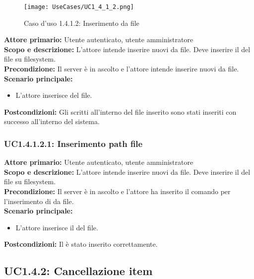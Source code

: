 \documentclass{scalatekids-article}
\begin{document}
\begin{figure}[H]
  \begin{center}
    \texttt{[image: UseCases/UC1\_4\_1\_2.png]}
    \caption*{Caso d'uso 1.4.1.2: Inserimento  da file}
  \end{center}
\end{figure}
\textbf{Attore primario:} Utente autenticato, utente amministratore\\
\textbf{Scopo e descrizione:} L'attore intende inserire nuovi  da file. Deve inserire il  del file su filesystem.\\
\textbf{Precondizione:} Il server è in ascolto e l'attore intende inserire nuovi  da file.\\
\textbf{Scenario principale:}
\begin{itemize}
\item L'attore inserisce  del file.
\end{itemize}
\textbf{Postcondizioni:} Gli  scritti all'interno del file inserito sono stati inseriti con successo all'interno del sistema.%

\subsubsection{UC1.4.1.2.1: Inserimento path file}

\textbf{Attore primario:} Utente autenticato, utente amministratore\\
\textbf{Scopo e descrizione:} L'attore intende inserire nuovi  da file. Deve inserire il  del file su filesystem.\\
\textbf{Precondizione:} Il server è in ascolto e l'attore ha inserito il comando per l'inserimento di  da file.\\
\textbf{Scenario principale:}
\begin{itemize}
\item L'attore inserisce il  del file.
\end{itemize}
\textbf{Postcondizioni:} Il  è stato inserito correttamente.

\subsection{UC1.4.2: Cancellazione item}
\end{document}
